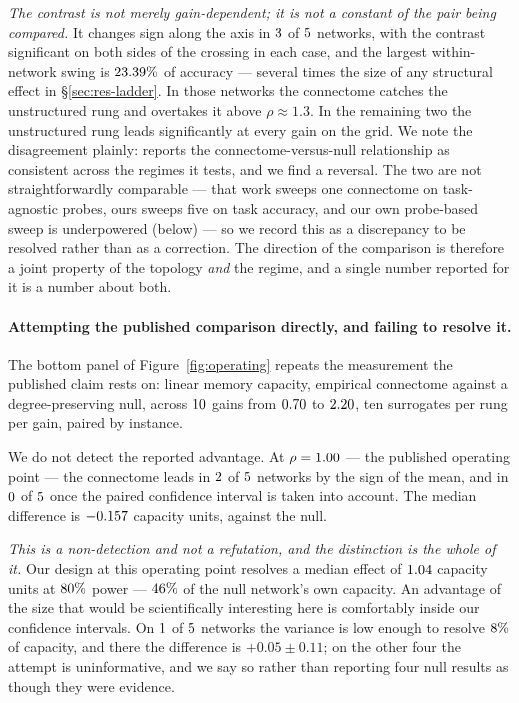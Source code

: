 \emph{The contrast is not merely gain-dependent; it is not a constant of the pair being
compared.} It changes sign
along the axis in $3$ of $5$ networks, with the contrast
significant on both sides of the crossing in each case, and the largest within-network
swing is $23.39\%$ of accuracy --- several times the size of any structural effect in
\S\ref{sec:res-ladder}. In those networks the connectome catches the unstructured rung and
overtakes it above $\rho \approx 1.3$. In the remaining two the unstructured rung leads
significantly at every gain on the grid. We note the disagreement plainly:
\cite{hyperparam2026determinants} reports the connectome-versus-null relationship as
consistent across the regimes it tests, and we find a reversal. The two are not
straightforwardly comparable --- that work sweeps one connectome on task-agnostic probes,
ours sweeps five on task accuracy, and our own probe-based sweep is underpowered
(below) --- so we record this as a discrepancy to be resolved rather than as a
correction. The direction of the comparison is therefore a
joint property of the topology \emph{and} the regime, and a single number reported for it
is a number about both.

\paragraph{Attempting the published comparison directly, and failing to resolve it.}
The bottom panel of Figure~\ref{fig:operating} repeats the measurement the published claim
rests on: linear memory capacity, empirical connectome against a degree-preserving null,
across $10$ gains from $0.70$ to $2.20$, ten surrogates per rung
per gain, paired by instance.

We do not detect the reported advantage. At $\rho = 1.00$ --- the published
operating point --- the connectome leads in $2$ of $5$
networks by the sign of the mean, and in $0$ of $5$ once
the paired confidence interval is taken into account. The median difference is
$-0.157$ capacity units, against the null.

\emph{This is a non-detection and not a refutation, and the distinction is the whole of
it.} Our design at this operating point resolves a median effect of $1.04$
capacity units at $80\%$ power --- $46\%$ of the null network's own
capacity. An advantage of the size that would be scientifically interesting here is
comfortably inside our confidence intervals. On $1$ of $5$
networks the variance is low enough to resolve $8\%$ of capacity, and there
the difference is $+0.05 \pm 0.11$; on the other four the attempt is uninformative, and we
say so rather than reporting four null results as though they were evidence.


